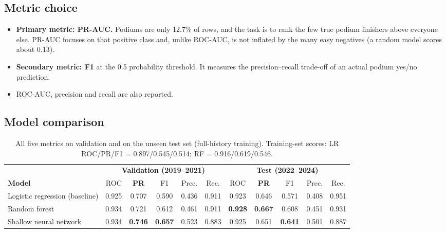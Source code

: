 \documentclass[11pt,a4paper]{article}
\begin{document}
\subsection{Metric choice}
\begin{itemize}
  \item \textbf{Primary metric: PR-AUC.} Podiums are only 12.7\% of rows, and the task is to rank the few true podium finishers above everyone else. PR-AUC focuses on that positive class and, unlike ROC-AUC, is not inflated by the many easy negatives (a random model scores about 0.13).
  \item \textbf{Secondary metric: F1} at the 0.5 probability threshold. It measures the precision--recall trade-off of an actual podium yes/no prediction.
  \item ROC-AUC, precision and recall are also reported.
\end{itemize}

\subsection{Model comparison}
\begin{table}[!htbp]
\centering\small
\setlength{\tabcolsep}{4pt}
\begin{tabular}{lccccc|ccccc}
\toprule
& \multicolumn{5}{c|}{\textbf{Validation (2019--2021)}} & \multicolumn{5}{c}{\textbf{Test (2022--2024)}}\\
\textbf{Model} & ROC & \textbf{PR} & F1 & Prec. & Rec. & ROC & \textbf{PR} & F1 & Prec. & Rec.\\
\midrule
Logistic regression (baseline) & 0.925 & 0.707 & 0.590 & 0.436 & 0.911 & 0.923 & 0.646 & 0.571 & 0.408 & 0.951\\
Random forest & 0.934 & 0.721 & 0.612 & 0.461 & 0.911 & \textbf{0.928} & \textbf{0.667} & 0.608 & 0.451 & 0.931\\
Shallow neural network & 0.934 & \textbf{0.746} & \textbf{0.657} & 0.523 & 0.883 & 0.925 & 0.651 & \textbf{0.641} & 0.501 & 0.887\\
\bottomrule
\end{tabular}
\caption{All five metrics on validation and on the unseen test set (full-history training). Training-set scores: LR ROC/PR/F1 = 0.897/0.545/0.514; RF = 0.916/0.619/0.546.}
\label{tab:models}
\end{table}
\end{document}
